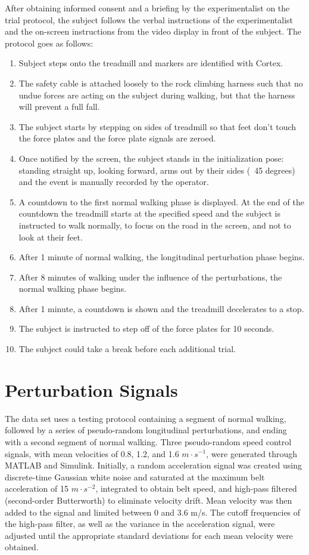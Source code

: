 \documentclass[10pt,a4paper,twocolumn]{article}
\begin{document}
After obtaining informed consent and a briefing by the experimentalist on the trial protocol, the subject
follows the verbal instructions of the experimentalist and the on-screen
instructions from the video display in front of the subject. The protocol goes
as follows:
%
\begin{enumerate}
  \item Subject steps onto the treadmill and markers are identified with
    Cortex.
  \item The safety cable is attached loosely to the rock climbing harness such
    that no undue forces are acting on the subject during walking, but that the
    harness will prevent a full fall.
  \item The subject starts by stepping on sides of treadmill so that feet don't
    touch the force plates and the force plate signals are zeroed.
  \item Once notified by the screen, the subject stands in the initialization
    pose: standing straight up, looking forward, arms out by their sides (~45
    degrees) and the event is manually recorded by the operator.
  \item A countdown to the first normal walking phase is displayed. At the end
    of the countdown the treadmill starts at the specified speed and the
    subject is instructed to walk normally, to focus on the road in the
    screen, and not to look at their feet.
  \item After 1 minute of normal walking, the longitudinal perturbation phase
    begins.
  \item After 8 minutes of walking under the influence of the perturbations,
    the normal walking phase begins.
  \item After 1 minute, a countdown is shown and the treadmill decelerates to a
    stop.
  \item The subject is instructed to step off of the force plates for 10
    seconds.
  \item The subject could take a break before each additional trial.
\end{enumerate}

\section*{Perturbation Signals}
%
The data set uses a testing protocol containing a segment of normal walking,
followed by a series of pseudo-random longitudinal perturbations, and ending
with a second segment of normal walking. Three pseudo-random speed control
signals, with mean velocities of 0.8, 1.2, and 1.6 $m \cdot s^{-1}$, were
generated through MATLAB and Simulink. Initially, a random acceleration signal
was created using discrete-time Gaussian white noise and saturated at the
maximum belt acceleration of 15 $m \cdot s^{-2}$, integrated to obtain belt
speed, and high-pass filtered (second-order Butterworth) to eliminate velocity
drift. Mean velocity was then added to the signal and limited between 0 and 3.6
m/s. The cutoff frequencies of the high-pass filter, as well as the variance in
the acceleration signal, were adjusted until the appropriate standard
deviations for each mean velocity were obtained.
\end{document}
